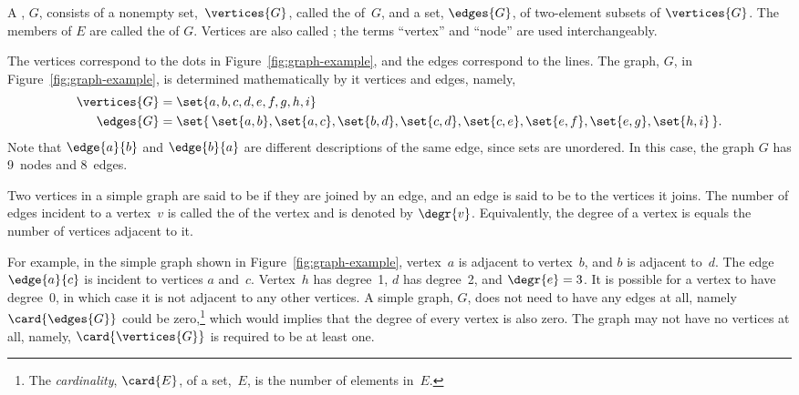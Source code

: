 \begin{definition}\label{graphdef}
  A , $G$, consists of a nonempty set,~$\vertices{G}$,
  called the  of~$G$, and a set, $\edges{G}$, of
  two-element subsets of $\vertices{G}$.  The members of $E$ are called
  the  of $G$.  Vertices are also called ; the
  terms ``vertex'' and ``node'' are used interchangeably.
\end{definition}
The vertices correspond to the dots in Figure~\ref{fig:graph-example},
and the edges correspond to the lines.  The graph, $G$, in
Figure~\ref{fig:graph-example}, is determined  mathematically by it
vertices and edges, namely,
\begin{align*}
\vertices{G} & =  \set{a, b, c, d, e, f, g, h, i} \\
\edges{G} & =  \set{\, \set{a, b}, \set{a, c}, \set{b, d}, \set{c, d},
              \set{c, e}, \set{e, f}, \set{e, g}, \set{h, i} \,}.
\end{align*}
Note that $\edge{a}{b}$ and $\edge{b}{a}$ are different
descriptions of the same edge, since sets are unordered.  In this case,
the graph $G$ has 9~nodes and 8~edges.

\begin{definition}
Two vertices in a simple graph are said to be  if they are
joined by an edge, and an edge is said to be  to the
vertices it joins.  The number of edges incident to a vertex~$v$ is called
the  of the vertex and is denoted by $\degr{v}$.
Equivalently, the degree of a vertex is equals the number of vertices
adjacent to it.
\end{definition}
For example, in the simple graph shown in
Figure~\ref{fig:graph-example}, vertex~$a$ is adjacent to vertex~$b$,
and $b$ is adjacent to~$d$.  The edge $\edge{a}{c}$ is incident to
vertices $a$ and~$c$.  Vertex~$h$ has degree~1, $d$ has degree~2, and
$\degr{e} = 3$.  It is possible for a vertex to have degree~0, in which
case it is not adjacent to any other vertices.  A simple graph, $G$, does
not need to have any edges at all, namely $\card{\edges{G}}$ could be
zero,\footnote{The \emph{cardinality}, $\card{E}$, of a set,~$E$, is the
number of elements in~$E$.} which would implies that the degree of every
vertex is also zero.  The graph may not have no vertices at all, namely,
$\card{\vertices{G}}$ is required to be at least one.

